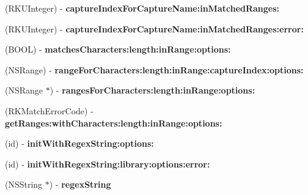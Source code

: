 \begin{DoxyCompactItemize}
\item 
\hypertarget{interface_r_k_regex_ac006c9fee29acc444c2596bf99e415cc}{(R\-K\-U\-Integer) -\/ {\bfseries capture\-Index\-For\-Capture\-Name\-:in\-Matched\-Ranges\-:}}\label{interface_r_k_regex_ac006c9fee29acc444c2596bf99e415cc}

\item 
\hypertarget{interface_r_k_regex_a54f94fa012e48e42c376908f58164e1c}{(R\-K\-U\-Integer) -\/ {\bfseries capture\-Index\-For\-Capture\-Name\-:in\-Matched\-Ranges\-:error\-:}}\label{interface_r_k_regex_a54f94fa012e48e42c376908f58164e1c}

\item 
\hypertarget{interface_r_k_regex_aa33efb469a55abee4c508f748d703aef}{(B\-O\-O\-L) -\/ {\bfseries matches\-Characters\-:length\-:in\-Range\-:options\-:}}\label{interface_r_k_regex_aa33efb469a55abee4c508f748d703aef}

\item 
\hypertarget{interface_r_k_regex_a9da47043b99002e9b5b3cb60e34a7d19}{(N\-S\-Range) -\/ {\bfseries range\-For\-Characters\-:length\-:in\-Range\-:capture\-Index\-:options\-:}}\label{interface_r_k_regex_a9da47043b99002e9b5b3cb60e34a7d19}

\item 
\hypertarget{interface_r_k_regex_a2b084eb136061edc6a39253709d145d3}{(N\-S\-Range $\ast$) -\/ {\bfseries ranges\-For\-Characters\-:length\-:in\-Range\-:options\-:}}\label{interface_r_k_regex_a2b084eb136061edc6a39253709d145d3}

\item 
\hypertarget{interface_r_k_regex_a81365eb7d809043ed0a1a27ec99c09c7}{(R\-K\-Match\-Error\-Code) -\/ {\bfseries get\-Ranges\-:with\-Characters\-:length\-:in\-Range\-:options\-:}}\label{interface_r_k_regex_a81365eb7d809043ed0a1a27ec99c09c7}

\item 
\hypertarget{interface_r_k_regex_a09c782cb88bbf39417598d137cd2f179}{(id) -\/ {\bfseries init\-With\-Regex\-String\-:options\-:}}\label{interface_r_k_regex_a09c782cb88bbf39417598d137cd2f179}

\item 
\hypertarget{interface_r_k_regex_a7c3af7648115f2edb42bb59beafafc9c}{(id) -\/ {\bfseries init\-With\-Regex\-String\-:library\-:options\-:error\-:}}\label{interface_r_k_regex_a7c3af7648115f2edb42bb59beafafc9c}

\item 
\hypertarget{interface_r_k_regex_a14f61c1e7cdd39971963e66988e7f60f}{(N\-S\-String $\ast$) -\/ {\bfseries regex\-String}}\label{interface_r_k_regex_a14f61c1e7cdd39971963e66988e7f60f}


\end{DoxyCompactItemize}

